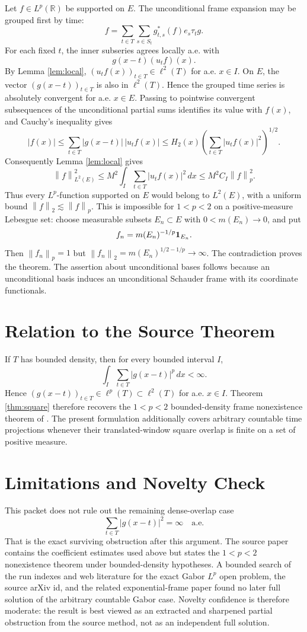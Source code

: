 \documentclass[11pt]{article}
\newcommand{\R}{\mathbb{R}}
\newcommand{\TT}{T}
\newcommand{\SSS}{S}
\newcommand{\norm}[1]{\left\lVert #1 \right\rVert}
\begin{document}
Let \(f\in L^p(\R)\) be supported on \(E\).  The unconditional frame expansion
may be grouped first by time:
\[
  f=\sum_{t\in\TT}\sum_{s\in\SSS_t}g^*_{t,s}(f)e_s\tau_tg .
\]
For each fixed \(t\), the inner subseries agrees locally a.e. with
\[
  g(x-t)(u_tf)(x).
\]
By Lemma \ref{lem:local}, \((u_tf(x))_{t\in\TT}\in\ell^2(\TT)\) for a.e.
\(x\in I\).  On \(E\), the vector \((g(x-t))_{t\in\TT}\) is also in
\(\ell^2(\TT)\).  Hence the grouped time series is absolutely convergent for
a.e. \(x\in E\).  Passing to pointwise convergent subsequences of the
unconditional partial sums identifies its value with \(f(x)\), and Cauchy's
inequality gives
\[
  |f(x)|
  \le \sum_{t\in\TT}|g(x-t)|\,|u_tf(x)|
  \le H_2(x)\left(\sum_{t\in\TT}|u_tf(x)|^2\right)^{1/2}.
\]
Consequently Lemma \ref{lem:local} gives
\[
  \norm{f}_{L^2(E)}^2
  \le M^2\int_I\sum_{t\in\TT}|u_tf(x)|^2\,dx
  \le M^2 C_I\norm{f}_p^2 .
\]
Thus every \(L^p\)-function supported on \(E\) would belong to \(L^2(E)\), with
a uniform bound \(\norm{f}_{2}\lesssim\norm{f}_{p}\).  This is impossible for
\(1<p<2\) on a positive-measure Lebesgue set: choose measurable subsets
\(E_n\subset E\) with \(0<m(E_n)\to0\), and put
\[
  f_n=m(E_n)^{-1/p}{\bf 1}_{E_n}.
\]
Then \(\norm{f_n}_p=1\) but
\(\norm{f_n}_2=m(E_n)^{1/2-1/p}\to\infty\).  The contradiction proves the
theorem.  The assertion about unconditional bases follows because an
unconditional basis induces an unconditional Schauder frame with its coordinate
functionals.

\section*{Relation to the Source Theorem}

If \(\TT\) has bounded density, then for every bounded interval \(I\),
\[
  \int_I\sum_{t\in\TT}|g(x-t)|^p\,dx<\infty.
\]
Hence \((g(x-t))_{t\in\TT}\in\ell^p(\TT)\subset\ell^2(\TT)\) for a.e.
\(x\in I\).  Theorem \ref{thm:square} therefore recovers the \(1<p<2\)
bounded-density frame nonexistence theorem of \cite{LTGabor}.  The present
formulation additionally covers arbitrary countable time projections whenever
their translated-window square overlap is finite on a set of positive measure.

\section*{Limitations and Novelty Check}

This packet does not rule out the remaining dense-overlap case
\[
  \sum_{t\in\TT}|g(x-t)|^2=\infty\quad\text{a.e.}
\]
That is the exact surviving obstruction after this argument.  The source paper
contains the coefficient estimates used above but states the \(1<p<2\)
nonexistence theorem under bounded-density hypotheses.  A bounded search of
the run indexes and web literature for the exact Gabor \(L^p\) open problem,
the source arXiv id, and the related exponential-frame paper
\cite{LTExp} found no later full solution of the arbitrary countable Gabor
case.  Novelty confidence is therefore moderate: the result is best viewed as
an extracted and sharpened partial obstruction from the source method, not as
an independent full solution.
\end{document}
